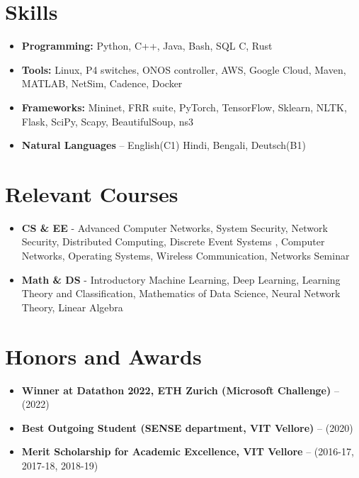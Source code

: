 \documentclass[11pt,a4paper,sans]{moderncv}        %
\begin{document}
\section{Skills}

\vspace{1pt}

\begin{itemize}

\item \textbf{Programming:} Python, C++, Java, Bash, SQL C, Rust

\vspace{1pt}

\item \textbf{Tools:} Linux,  P4 switches, ONOS controller, AWS, Google Cloud, Maven, MATLAB, NetSim, Cadence, Docker

\vspace{1pt}

\item \textbf{Frameworks:} Mininet, FRR suite, PyTorch, TensorFlow, Sklearn, NLTK, Flask, SciPy, Scapy, BeautifulSoup, ns3

\item \textbf{Natural Languages} -- English(C1) Hindi, Bengali, Deutsch(B1)

\end{itemize}

\section{Relevant Courses}
\begin{itemize}
\item \textbf{CS \& EE} - Advanced Computer Networks, System Security, Network Security, Distributed Computing, Discrete Event Systems , Computer Networks, Operating Systems, Wireless Communication, Networks Seminar
\item \textbf{Math \& DS} - Introductory Machine Learning, Deep Learning, Learning Theory and Classification, Mathematics of Data Science, Neural Network Theory, Linear Algebra
\end{itemize}

\section{Honors and Awards}

\vspace{1pt}

\begin{itemize}
\item \textbf{Winner at Datathon 2022, ETH Zurich (Microsoft Challenge)} -- (2022)
\item \textbf{Best Outgoing Student (SENSE department, VIT Vellore)} -- (2020)
\item \textbf{Merit Scholarship for Academic Excellence, VIT Vellore } -- (2016-17, 2017-18, 2018-19)

\end{itemize}
\end{document}
